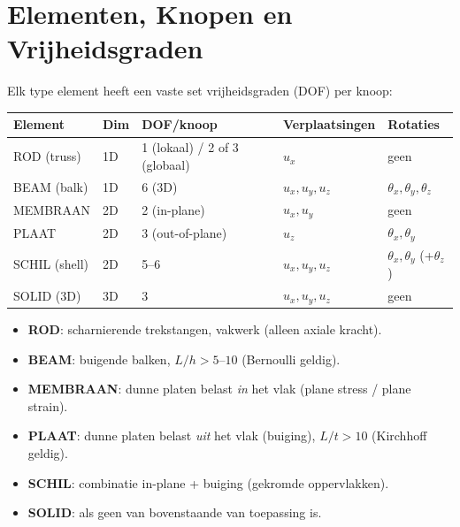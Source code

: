 \documentclass[a4paper,10pt]{article}
\begin{document}
\section{Elementen, Knopen en Vrijheidsgraden}

Elk type element heeft een vaste set vrijheidsgraden (DOF) per knoop:

\begin{center}
\renewcommand{\arraystretch}{1.3}
\begin{tabular}{lllll}
\toprule
\textbf{Element} & \textbf{Dim} & \textbf{DOF/knoop} & \textbf{Verplaatsingen} & \textbf{Rotaties}\\
\midrule
ROD (truss)   & 1D & 1 (lokaal) / 2 of 3 (globaal) & $u_x$ & geen\\
BEAM (balk)   & 1D & 6 (3D) & $u_x,u_y,u_z$ & $\theta_x,\theta_y,\theta_z$\\
MEMBRAAN      & 2D & 2 (in-plane) & $u_x,u_y$ & geen\\
PLAAT         & 2D & 3 (out-of-plane) & $u_z$ & $\theta_x,\theta_y$\\
SCHIL (shell) & 2D & 5--6 & $u_x,u_y,u_z$ & $\theta_x,\theta_y$ (+$\theta_z$)\\
SOLID (3D)    & 3D & 3 & $u_x,u_y,u_z$ & geen\\
\bottomrule
\end{tabular}
\end{center}

\begin{exambox}
\begin{itemize}
  \item \textbf{ROD}: scharnierende trekstangen, vakwerk (alleen axiale kracht).
  \item \textbf{BEAM}: buigende balken, $L/h > 5\text{--}10$ (Bernoulli geldig).
  \item \textbf{MEMBRAAN}: dunne platen belast \emph{in} het vlak (plane stress / plane strain).
  \item \textbf{PLAAT}: dunne platen belast \emph{uit} het vlak (buiging), $L/t > 10$ (Kirchhoff geldig).
  \item \textbf{SCHIL}: combinatie in-plane + buiging (gekromde oppervlakken).
  \item \textbf{SOLID}: als geen van bovenstaande van toepassing is.
\end{itemize}
\end{exambox}
\end{document}
